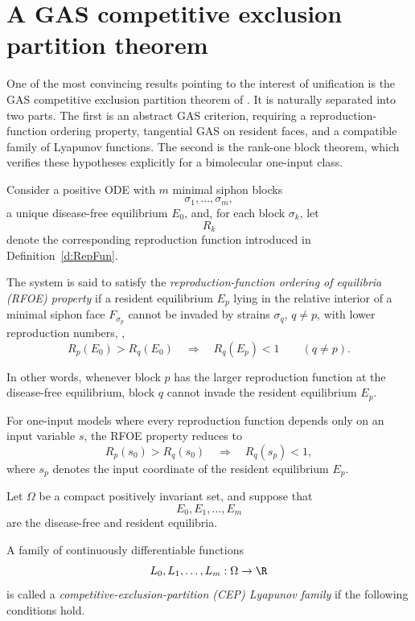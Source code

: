 \section{A GAS competitive exclusion partition theorem \cite{AAHRah}}

One of the most convincing results pointing to the interest of unification is the GAS competitive exclusion partition theorem of \cite{AAHRah}. It  is  naturally
separated into two parts.  The first is an abstract GAS criterion, requiring a
reproduction-function ordering property, tangential GAS on resident faces, and
a compatible family of Lyapunov functions.  The second is the rank-one block theorem, which verifies these
hypotheses explicitly for a bimolecular one-input class.


Consider a positive ODE with $m$ minimal siphon blocks
\[
\sigma_1,\ldots,\sigma_m,
\]
a unique disease-free equilibrium $E_0$, and, for each block
$\sigma_k$, let
\[
R_k
\]
denote the corresponding reproduction function introduced in
Definition~\ref{d:RepFun}.

The system is said to satisfy the
\emph{reproduction-function ordering of equilibria (RFOE) property} if a
resident equilibrium $E_p$ lying in the relative interior of a minimal
siphon face $F_{\sigma_p}$ cannot be invaded by strains $\sigma_q$,
$q\ne p$, with lower reproduction numbers, \ie,
\[
R_p(E_0)>R_q(E_0)
\quad\Longrightarrow\quad
R_q(E_p)<1
\qquad(q\ne p).
\]

In other words, whenever block $p$ has the larger reproduction function
at the disease-free equilibrium, block $q$ cannot invade the
resident equilibrium $E_p$.

For one-input models where every reproduction function depends only on
an input variable $s$, the RFOE property reduces to
\[
R_p(s_0)>R_q(s_0)
\quad\Longrightarrow\quad
R_q(s_p)<1,
\]
where $s_p$ denotes the input coordinate of the resident equilibrium
$E_p$.

\eeD


Let $\Omega$ be a compact positively invariant set, and suppose that
\[
E_0,E_1,\ldots,E_m
\]
are the disease-free and resident equilibria.

A family of continuously differentiable functions
\[
L_0,L_1,\ldots,L_m:\Omega\to\R
\]
is called a \emph{competitive-exclusion-partition (CEP) Lyapunov family}
if the following conditions hold.

